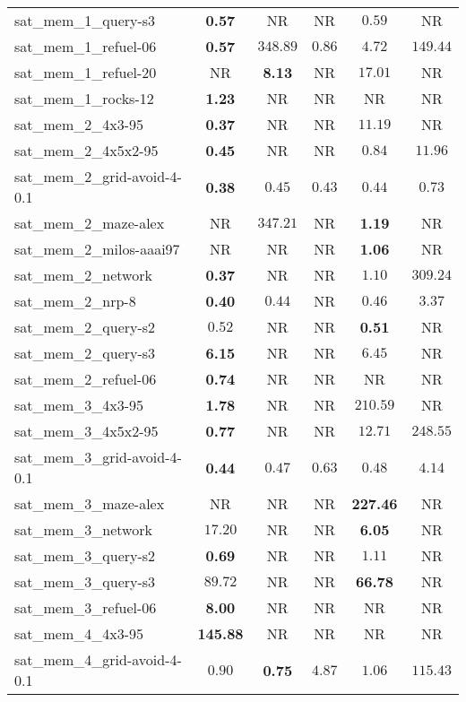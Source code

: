 \begin{tabular}{lccccc}
sat\_mem\_1\_query-s3 & \textbf{0.57} & NR & NR & $0.59$ & NR \\
sat\_mem\_1\_refuel-06 & \textbf{0.57} & $348.89$ & $0.86$ & $4.72$ & $149.44$ \\
sat\_mem\_1\_refuel-20 & NR & \textbf{8.13} & NR & $17.01$ & NR \\
sat\_mem\_1\_rocks-12 & \textbf{1.23} & NR & NR & NR & NR \\
sat\_mem\_2\_4x3-95 & \textbf{0.37} & NR & NR & $11.19$ & NR \\
sat\_mem\_2\_4x5x2-95 & \textbf{0.45} & NR & NR & $0.84$ & $11.96$ \\
sat\_mem\_2\_grid-avoid-4-0.1 & \textbf{0.38} & $0.45$ & $0.43$ & $0.44$ & $0.73$ \\
sat\_mem\_2\_maze-alex & NR & $347.21$ & NR & \textbf{1.19} & NR \\
sat\_mem\_2\_milos-aaai97 & NR & NR & NR & \textbf{1.06} & NR \\
sat\_mem\_2\_network & \textbf{0.37} & NR & NR & $1.10$ & $309.24$ \\
sat\_mem\_2\_nrp-8 & \textbf{0.40} & $0.44$ & NR & $0.46$ & $3.37$ \\
sat\_mem\_2\_query-s2 & $0.52$ & NR & NR & \textbf{0.51} & NR \\
sat\_mem\_2\_query-s3 & \textbf{6.15} & NR & NR & $6.45$ & NR \\
sat\_mem\_2\_refuel-06 & \textbf{0.74} & NR & NR & NR & NR \\
sat\_mem\_3\_4x3-95 & \textbf{1.78} & NR & NR & $210.59$ & NR \\
sat\_mem\_3\_4x5x2-95 & \textbf{0.77} & NR & NR & $12.71$ & $248.55$ \\
sat\_mem\_3\_grid-avoid-4-0.1 & \textbf{0.44} & $0.47$ & $0.63$ & $0.48$ & $4.14$ \\
sat\_mem\_3\_maze-alex & NR & NR & NR & \textbf{227.46} & NR \\
sat\_mem\_3\_network & $17.20$ & NR & NR & \textbf{6.05} & NR \\
sat\_mem\_3\_query-s2 & \textbf{0.69} & NR & NR & $1.11$ & NR \\
sat\_mem\_3\_query-s3 & $89.72$ & NR & NR & \textbf{66.78} & NR \\
sat\_mem\_3\_refuel-06 & \textbf{8.00} & NR & NR & NR & NR \\
sat\_mem\_4\_4x3-95 & \textbf{145.88} & NR & NR & NR & NR \\
sat\_mem\_4\_grid-avoid-4-0.1 & $0.90$ & \textbf{0.75} & $4.87$ & $1.06$ & $115.43$ \\

\end{tabular}
